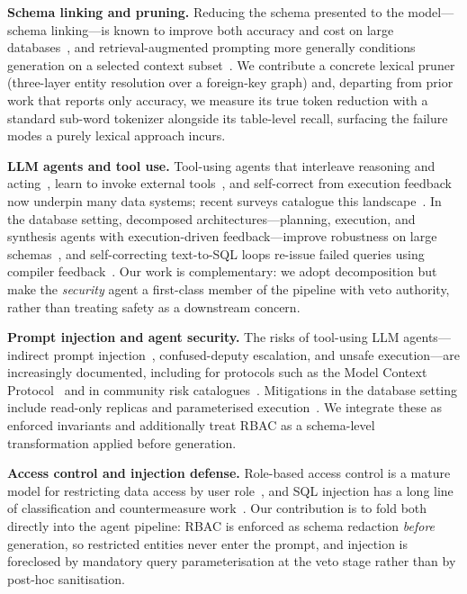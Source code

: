 \documentclass[runningheads]{llncs}
\begin{document}
\textbf{Schema linking and pruning.} Reducing the schema presented to the model---schema linking---is known to improve both accuracy and cost on large databases~\cite{wang2020ratsql,lei2020schemalinking}, and retrieval-augmented prompting more generally conditions generation on a selected context subset~\cite{lewis2020rag}. We contribute a concrete lexical pruner (three-layer entity resolution over a foreign-key graph) and, departing from prior work that reports only accuracy, we measure its true token reduction with a standard sub-word tokenizer alongside its table-level recall, surfacing the failure modes a purely lexical approach incurs.

\textbf{LLM agents and tool use.} Tool-using agents that interleave reasoning and acting~\cite{yao2023react}, learn to invoke external tools~\cite{schick2023toolformer}, and self-correct from execution feedback~\cite{shinn2023reflexion} now underpin many data systems; recent surveys catalogue this landscape~\cite{wang2024agentsurvey}. In the database setting, decomposed architectures---planning, execution, and synthesis agents with execution-driven feedback---improve robustness on large schemas~\cite{spider2,puppygraph}, and self-correcting text-to-SQL loops re-issue failed queries using compiler feedback~\cite{ghosh}. Our work is complementary: we adopt decomposition but make the \emph{security} agent a first-class member of the pipeline with veto authority, rather than treating safety as a downstream concern.

\textbf{Prompt injection and agent security.} The risks of tool-using LLM agents---indirect prompt injection~\cite{greshake2023injection,perez2022ignore}, confused-deputy escalation, and unsafe execution---are increasingly documented, including for protocols such as the Model Context Protocol~\cite{mcp-security} and in community risk catalogues~\cite{owasp2025llm}. Mitigations in the database setting include read-only replicas and parameterised execution~\cite{rietta}. We integrate these as enforced invariants and additionally treat RBAC as a schema-level transformation applied before generation.

\textbf{Access control and injection defense.} Role-based access control is a mature model for restricting data access by user role~\cite{sandhu1996rbac,ferraiolo2001rbac}, and SQL injection has a long line of classification and countermeasure work~\cite{halfond2006sqli}. Our contribution is to fold both directly into the agent pipeline: RBAC is enforced as schema redaction \emph{before} generation, so restricted entities never enter the prompt, and injection is foreclosed by mandatory query parameterisation at the veto stage rather than by post-hoc sanitisation.
\end{document}
